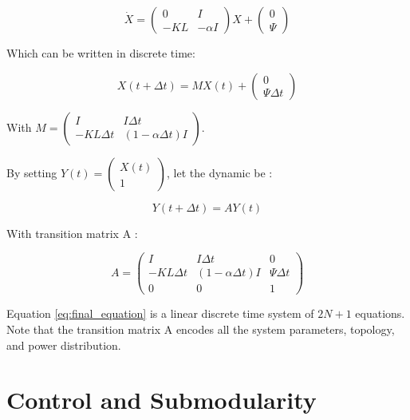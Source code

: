 \documentclass[conference]{IEEEtran}
\begin{document}
\begin{equation}
 \dot{X} = \left( \begin{array}{cc} 0 & I \\ - KL & -\alpha I \end{array} \right) X + \left( \begin{array}{c} 0 \\ \Psi \end{array} \right)
\end{equation}
 
Which can be written in discrete time: 

\begin{equation} 
X(t+\Delta t) = M  X(t) +  \left( \begin{array}{c} 0 \\ \Psi \Delta t \end{array} \right)
\end{equation} 

With $ M = \left( \begin{array}{cc} I & I \Delta t \\ -KL \Delta t & (1-\alpha \Delta t) I \end{array} \right) $.

By setting $ Y(t) =  \left( \begin{array}{c} X(t) \\ 1 \end{array} \right) $, let the dynamic be :

\begin{equation}
\label{eq:final_equation}
 Y(t+\Delta t) = A Y(t)
\end{equation}

With transition matrix A :

\begin{equation}
 A =   \left( \begin{array}{ccc} I & I \Delta t & 0 \\ -KL \Delta t & (1-\alpha \Delta t)I & \Psi \Delta t \\ 0&0&1 \end{array} \right)
\end{equation}

Equation \ref{eq:final_equation} is a linear discrete time system of $ 2 N + 1 $ equations. Note that the transition matrix A encodes all the system parameters, topology, and power distribution.



\section{Control and Submodularity}
\label{sec:control_and_submodularity}
\end{document}
